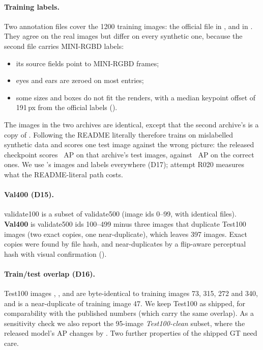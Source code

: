 \paragraph{Training labels.} Two annotation files cover the 1200 training images: the official  file in , and  in . They agree on the real images but differ on every synthetic one, because the second file carries MINI-RGBD labels:
\begin{itemize}[leftmargin=*]
  \item its source fields point to MINI-RGBD frames;
  \item eyes and ears are zeroed on most entries;
  \item some sizes and boxes do not fit the renders, with a median keypoint offset of 191\,px from the official labels ().
\end{itemize}
The images in the two archives are identical, except that the second archive's  is a copy of .
Following the README literally therefore trains on mislabelled synthetic data and scores one test image against the wrong picture: the released checkpoint scores ~AP on that archive's test images, against ~AP on the correct ones.
We use 's images and  labels everywhere (D17); attempt R020 measures what the README-literal path costs.

\paragraph{Val400 (D15).} validate100 is a subset of validate500 (image ids 0--99, with identical files). \textbf{Val400} is validate500 ids 100--499 minus three images that duplicate Test100 images (two exact copies, one near-duplicate), which leaves 397 images.
Exact copies were found by file hash, and near-duplicates by a flip-aware perceptual hash with visual confirmation ().

\paragraph{Train/test overlap (D16).} Test100 images , ,  and  are byte-identical to training images 73, 315, 272 and 340, and  is a near-duplicate of training image 47.
We keep Test100 as shipped, for comparability with the published numbers (which carry the same overlap). As a sensitivity check we also report the 95-image \emph{Test100-clean} subset, where the released model's AP changes by .
Two further properties of the shipped GT need care.

